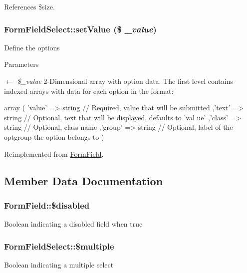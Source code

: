 References \$size.

\subsubsection[{setValue}]{\setlength{\rightskip}{0pt plus 5cm}FormFieldSelect::setValue (\$ {\em \_\-value})}\label{classFormFieldSelect_ae69f5b352df63796c048dca6a2de7544}
Define the options 
\begin{DoxyParams}{Parameters}
\item[\mbox{$\leftarrow$} {\em \$\_\-value}]2-\/Dimensional array with option data. The first level contains indexed arrays with data for each option in the format: 
\begin{DoxyCode}
 array (
     'value' => string // Required, value that will be submitted
    ,'text'  => string // Optional, text that will be displayed, defaults to 'val
      ue'
    ,'class' => string // Optional, class name
    ,'group' => string // Optional, label of the optgroup the option belongs to
 )
\end{DoxyCode}
 \end{DoxyParams}


Reimplemented from \hyperlink{classFormField_a465ff61e290d82be96bb793c3a14b3e7}{FormField}.



\subsection{Member Data Documentation}
\subsubsection[{\$disabled}]{\setlength{\rightskip}{0pt plus 5cm}FormField::\$disabled}\label{classFormField_ab6f1907061890290e32cb2befc0a5f50}
Boolean indicating a disabled field when true 
\subsubsection[{\$multiple}]{\setlength{\rightskip}{0pt plus 5cm}FormFieldSelect::\$multiple}\label{classFormFieldSelect_a6eb8f177d1cfd20845509c0a35120725}
Boolean indicating a multiple select 
